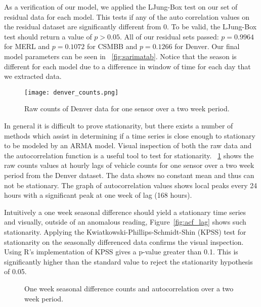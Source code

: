 As a verification of our model, we applied the LJung-Box test \cite{Ljung1978} on our set of residual data for each model.  This tests if any of the auto correlation values on the residual dataset are significantly different from 0.  To be valid, the LJung-Box test should return a value of $p > 0.05$.  All of our residual sets passed: $p = 0.9964$ for MERL and $p = 0.1072$ for CSMBB and $p = 0.1266$ for Denver.  Our final model parameters can be seen in ~\ref{fig:sarimatab}.  Notice that the season is different for each model due to a difference in window of time for each day that we extracted data.

\begin{figure}[]
	\begin{center}
		\texttt{[image: denver\_counts.png]}
	\end{center}
	\caption{Raw counts of Denver data for one sensor over a two week period.}
	\label{fig:denver_raw_data}
\end{figure}

In general it is difficult to prove stationarity, but there exists a number of methods which assist in determining if a time series is close enough to stationary to be modeled by an ARMA model.  Visual inspection of both the raw data and the autocorrelation function is a useful tool to test for stationarity.  ~\ref{fig:denver_raw_data} shows the raw counts values at hourly lags of vehicle counts for one sensor over a two week period from the Denver dataset.  The data shows no constant mean and thus can not be stationary.  The graph of autocorrelation values shows local peaks every 24 hours with a significant peak at one week of lag (168 hours).

Intuitively a one week seasonal difference should yield a stationary time series and visually, outside of an anomalous reading, Figure~\ref{fig:acf_lag} shows such stationarity.  Applying the Kwiatkowski-Phillips-Schmidt-Shin (KPSS) \cite{Kwiatkowski1992} test for stationarity on the seasonally differenced data confirms the visual inspection.  Using R's implementation of KPSS gives a p-value greater than 0.1.  This is significantly higher than the standard value to reject the stationarity hypothesis of 0.05.  

\begin{figure}[t]
\begin{center}
\end{center}
\caption{One week seasonal difference counts and autocorrelation over a two week period.}
\label{fig:lag_data}
\end{figure}

